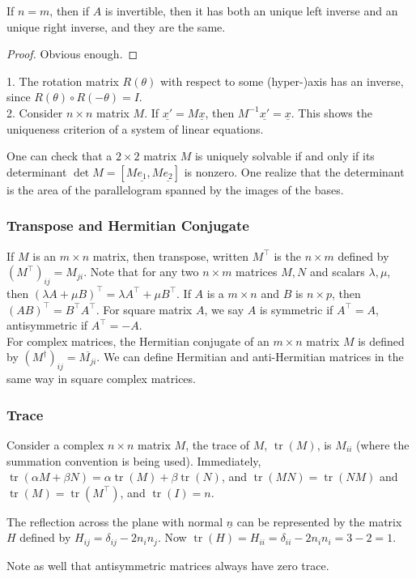 \begin{proposition}
    If $n=m$, then if $A$ is invertible, then it has both an unique left inverse and an unique right inverse, and they are the same.
\end{proposition}
\begin{proof}
    Obvious enough.
\end{proof}
\begin{example}
    1. The rotation matrix $R(\theta)$ with respect to some (hyper-)axis has an inverse, since $R(\theta)\circ R(-\theta)=I$.\\
    2. Consider $n\times n$ matrix $M$.
    If $\underline{x'}=M\underline{x}$, then $M^{-1}\underline{x'}=\underline{x}$.
    This shows the uniqueness criterion of a system of linear equations.
\end{example}
One can check that a $2\times 2$ matrix $M$ is uniquely solvable if and only if its determinant $\det M=[M\underline{e_1},M\underline{e_2}]$ is nonzero.
One realize that the determinant is the area of the parallelogram spanned by the images of the bases.
\subsubsection{Transpose and Hermitian Conjugate}
If $M$ is an $m\times n$ matrix, then transpose, written $M^\top$ is the $n\times m$ defined by $(M^\top)_{ij}=M_{ji}$.
Note that for any two $n\times m$ matrices $M,N$ and scalars $\lambda,\mu$, then $(\lambda A+\mu B)^\top=\lambda A^\top+\mu B^\top$.
If $A$ is a $m\times n$ and $B$ is $n\times p$, then $(AB)^\top=B^\top A^\top$.
For square matrix $A$, we say $A$ is symmetric if $A^\top=A$, antisymmetric if $A^\top=-A$.\\
For complex matrices, the Hermitian conjugate of an $m\times n$ matrix $M$ is defined by $(M^\dagger)_{ij}=\overline{M_{ji}}$.
We can define Hermitian and anti-Hermitian matrices in the same way in square complex matrices.
\subsubsection{Trace}
Consider a complex $n\times n$ matrix $M$, the trace of $M$, $\operatorname{tr}(M)$, is $M_{ii}$ (where the summation convention is being used).
Immediately, $\operatorname{tr}(\alpha M+\beta N)=\alpha\operatorname{tr}(M)+\beta\operatorname{tr}(N)$, and $\operatorname{tr}(MN)=\operatorname{tr}(NM)$ and $\operatorname{tr}(M)=\operatorname{tr}(M^\top)$, and $\operatorname{tr}(I)=n$.
\begin{example}
    The reflection across the plane with normal $\underline{n}$ can be represented by the matrix $H$ defined by $H_{ij}=\delta_{ij}-2n_in_j$.
    Now $\operatorname{tr}(H)=H_{ii}=\delta_{ii}-2n_in_i=3-2=1$.
\end{example}
Note as well that antisymmetric matrices always have zero trace.
